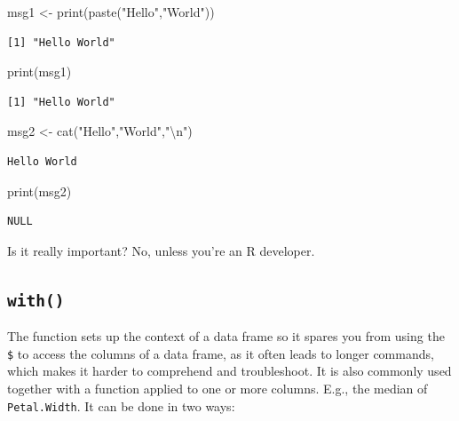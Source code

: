 \documentclass[
  letterpaper,
  DIV=11,
  numbers=noendperiod]{scrreprt}
\newenvironment{Shaded}{\begin{snugshade}}{\end{snugshade}}
\newcommand{\FunctionTok}[1]{\textcolor[rgb]{0.28,0.35,0.67}{#1}}
\newcommand{\NormalTok}[1]{\textcolor[rgb]{0.00,0.23,0.31}{#1}}
\newcommand{\OtherTok}[1]{\textcolor[rgb]{0.00,0.23,0.31}{#1}}
\newcommand{\SpecialCharTok}[1]{\textcolor[rgb]{0.37,0.37,0.37}{#1}}
\newcommand{\StringTok}[1]{\textcolor[rgb]{0.13,0.47,0.30}{#1}}
\begin{document}
\begin{Shaded}
\begin{Highlighting}[]
\NormalTok{msg1 }\OtherTok{\textless{}{-}} \FunctionTok{print}\NormalTok{(}\FunctionTok{paste}\NormalTok{(}\StringTok{"Hello"}\NormalTok{,}\StringTok{"World"}\NormalTok{))}
\end{Highlighting}
\end{Shaded}

\begin{verbatim}
[1] "Hello World"
\end{verbatim}

\begin{Shaded}
\begin{Highlighting}[]
\FunctionTok{print}\NormalTok{(msg1)}
\end{Highlighting}
\end{Shaded}

\begin{verbatim}
[1] "Hello World"
\end{verbatim}

\begin{Shaded}
\begin{Highlighting}[]
\NormalTok{msg2 }\OtherTok{\textless{}{-}} \FunctionTok{cat}\NormalTok{(}\StringTok{"Hello"}\NormalTok{,}\StringTok{"World"}\NormalTok{,}\StringTok{"}\SpecialCharTok{\textbackslash{}n}\StringTok{"}\NormalTok{)}
\end{Highlighting}
\end{Shaded}

\begin{verbatim}
Hello World 
\end{verbatim}

\begin{Shaded}
\begin{Highlighting}[]
\FunctionTok{print}\NormalTok{(msg2)}
\end{Highlighting}
\end{Shaded}

\begin{verbatim}
NULL
\end{verbatim}

Is it really important? No, unless you're an R developer.

\subsection{\texorpdfstring{\texttt{with()}}{with()}}\label{with}

The function sets up the context of a data frame so it spares you from
using the \texttt{\$} to access the columns of a data frame, as it often
leads to longer commands, which makes it harder to comprehend and
troubleshoot. It is also commonly used together with a function applied
to one or more columns. E.g., the median of \texttt{Petal.Width}. It can
be done in two ways:
\end{document}
